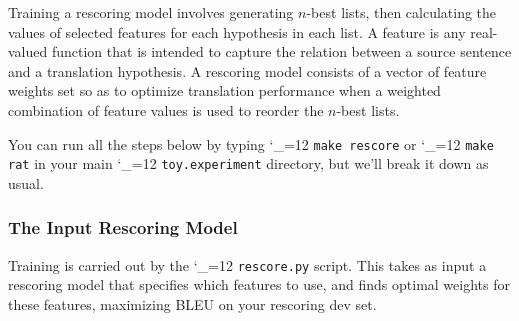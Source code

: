 \documentclass[11pt,letterpaper]{article}
\def\code{\begingroup\catcode`\_=12 \codex}
\newcommand{\codex}[1]{\texttt{#1}\endgroup}
\begin{document}
Training a rescoring model involves generating $n$-best lists, then calculating
the values of selected features for each hypothesis in each list. A
feature is any real-valued function that is intended to capture the relation
between a source sentence and a translation hypothesis. A rescoring model
consists of a vector of feature weights set so as to optimize translation
performance when a weighted combination of feature values is used to reorder
the $n$-best lists.

You can run all the steps below by typing \code{make rescore} or \code{make
rat} in your main \code{toy.experiment} directory, but we'll break it down as
usual.

\subsubsection{The Input Rescoring Model}

Training is carried out by the \code{rescore.py} script. This takes as input a
rescoring model that specifies which features to use, and finds optimal
weights for these features, maximizing BLEU on your rescoring dev set.
\end{document}
